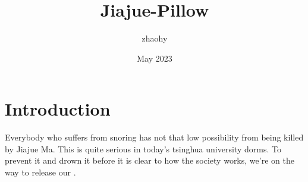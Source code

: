 \documentclass{article}
\title{Jiajue-Pillow}
\author{zhaohy}
\date{May 2023}
\begin{document}
\maketitle

\section{Introduction}
Everybody who suffers from snoring has not that low possibility from being killed by Jiajue Ma. This is quite  serious in today's tsinghua university dorms. To prevent it and drown it before it is clear to how the society works, we're on the way to release our .
\end{document}
